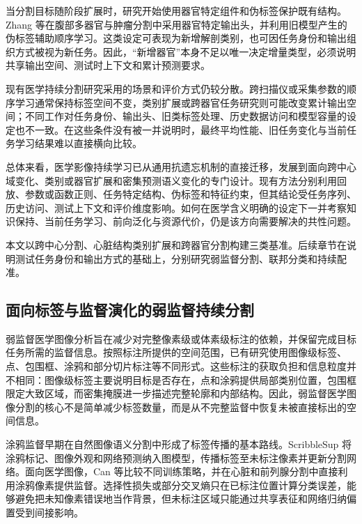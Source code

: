 当分割目标随阶段扩展时，研究开始使用器官特定组件和伪标签保护既有结构。Zhang 等在腹部多器官与肿瘤分割中采用器官特定输出头，并利用旧模型产生的伪标签辅助顺序学习\cite{zhang2023continualorgan}。这类设定可表现为新增解剖类别，也可因任务身份和输出组织方式被视为新任务。因此，“新增器官”本身不足以唯一决定增量类型，必须说明共享输出空间、测试时上下文和累计预测要求。

现有医学持续分割研究采用的场景和评价方式仍较分散。跨扫描仪或采集参数的顺序学习通常保持标签空间不变，类别扩展或跨器官任务研究则可能改变累计输出空间；不同工作对任务身份、输出头、旧类标签处理、历史数据访问和模型容量的设定也不一致\cite{karani2018lifelong,zhang2023s3r,gonzalez2023lifelong,zhang2023continualorgan}。在这些条件没有被一并说明时，最终平均性能、旧任务变化与当前任务学习结果难以直接横向比较。

总体来看，医学影像持续学习已从通用抗遗忘机制的直接迁移，发展到面向跨中心域变化、类别或器官扩展和密集预测语义变化的专门设计。现有方法分别利用回放、参数或函数正则、任务特定结构、伪标签和特征约束，但其结论受任务序列、历史访问、测试上下文和评价维度影响。如何在医学含义明确的设定下一并考察知识保持、当前任务学习、前向泛化与资源代价，仍是该方向需要解决的共性问题\cite{kumari2025medicalcl,yuan2024continualseg}。

本文以跨中心分割、心脏结构类别扩展和跨器官分割构建三类基准。后续章节在说明测试任务身份和输出方式的基础上，分别研究弱监督分割、联邦分类和持续配准。

\subsection{面向标签与监督演化的弱监督持续分割}
\label{subsec:intro-weak-partial-supervision}

弱监督医学图像分析旨在减少对完整像素级或体素级标注的依赖，并保留完成目标任务所需的监督信息。按照标注所提供的空间范围，已有研究使用图像级标签、点、包围框、涂鸦和部分切片标注等不同形式\cite{tajbakhsh2020imperfect}。这些标注的获取负担和信息粒度并不相同：图像级标签主要说明目标是否存在，点和涂鸦提供局部类别位置，包围框限定大致区域，而密集掩膜进一步描述完整轮廓和内部结构。因此，弱监督医学图像分割的核心不是简单减少标签数量，而是从不完整监督中恢复未被直接标出的空间信息。

涂鸦监督早期在自然图像语义分割中形成了标签传播的基本路线。ScribbleSup 将涂鸦标记、图像外观和网络预测纳入图模型，传播标签至未标注像素并更新分割网络\cite{lin2016scribblesup}。面向医学图像，Can 等比较不同训练策略，并在心脏和前列腺分割中直接利用涂鸦像素提供监督\cite{can2018scribble}。选择性损失或部分交叉熵只在已标注位置计算分类误差，能够避免把未知像素错误地当作背景，但未标注区域只能通过共享表征和网络归纳偏置受到间接影响。

